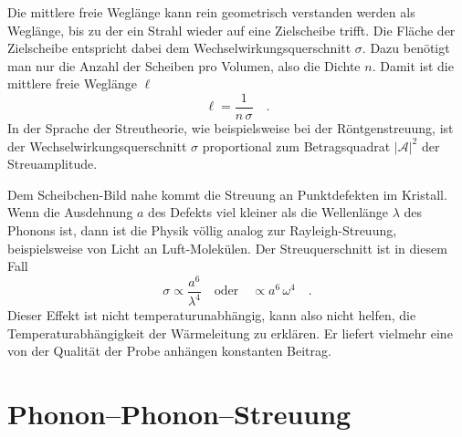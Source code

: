 Die mittlere freie Weglänge kann rein geometrisch verstanden werden als Weglänge, bis zu der ein Strahl wieder auf eine Zielscheibe trifft. Die Fläche der Zielscheibe entspricht dabei dem Wechselwirkungsquerschnitt $\sigma$. Dazu benötigt man nur die Anzahl der Scheiben pro Volumen, also die Dichte $n$. Damit ist die mittlere freie Weglänge $\ell$
\begin{equation}
    \ell = \frac{1}{n \, \sigma} \quad .  \label{eq:1_def_weglaenge} 
\end{equation}
In der Sprache der Streutheorie, wie beispielsweise bei der Röntgenstreuung, ist der Wechselwirkungsquerschnitt $\sigma$ proportional zum Betragsquadrat $|\mathcal{A}|^2$ der Streuamplitude.

Dem Scheibchen-Bild nahe kommt die Streuung an Punktdefekten im Kristall. Wenn die Ausdehnung $a$ des Defekts viel kleiner als die Wellenlänge $\lambda$ des Phonons ist, dann ist die Physik völlig analog zur Rayleigh-Streuung, beispielsweise von Licht an Luft-Molekülen. Der Streuquerschnitt ist in diesem Fall
\begin{equation}
    \sigma \propto \frac{a^6}{\lambda^4} \quad \text{oder} \quad \propto a^6 \, \omega^4 \quad .
\end{equation}
Dieser Effekt ist nicht temperaturunabhängig, kann also nicht helfen, die Temperaturabhängigkeit der Wärmeleitung zu erklären. Er liefert vielmehr eine von der Qualität der Probe anhängen konstanten Beitrag.



\section{Phonon--Phonon--Streuung}



